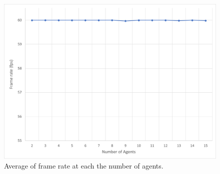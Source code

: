 \begin{figure}[H]\centering
	\includegraphics[width=1.0\textwidth]{Pictures/framerate.png}%
	\caption{Average of frame rate at each the number of agents.}\label{fig:framerate}%
	
\end{figure}